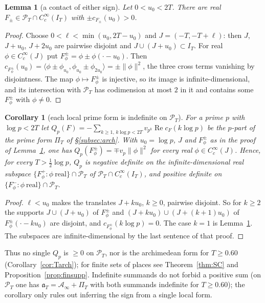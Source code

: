 \documentclass[11pt]{amsart}
\newtheorem{lemma}[theorem]{Lemma}
\newtheorem{corollary}[theorem]{Corollary}
\theoremstyle{definition}
\theoremstyle{remark}
\newcommand{\Rel}{\operatorname{Re}}
\newcommand{\PT}{\mathcal P_T}
\newcommand{\IT}{I_T}
\newcommand{\cF}{c_F}
\newcommand{\Ainf}{\mathcal A_\infty}
\newcommand{\PiT}{\Pi_T}
\begin{document}
\begin{lemma}[a contact of either sign]\label{lem:cpos}
Let $0<u_0<2T$. There are real $F_\pm\in\PT\cap C_c^\infty(\IT)$ with $\pm c_{F_\pm}(u_0)>0$.
\end{lemma}
\begin{proof}
Choose $0<\ell<\min(u_0,2T-u_0)$ and $J=(-T,-T+\ell)$: then $J$, $J+u_0$, $J+2u_0$ are pairwise disjoint
and $J\cup(J+u_0)\subset\IT$. For real $\phi\in C_c^\infty(J)$ put $F^\pm_\phi=\phi\pm\phi(\cdot-u_0)$. Then
$c_{F^\pm_\phi}(u_0)=\langle\phi\pm\phi_{u_0},\phi_{u_0}\pm\phi_{2u_0}\rangle=\pm\|\phi\|^2$, the three cross terms
vanishing by disjointness. The map $\phi\mapsto F^\pm_\phi$ is injective, so its image is
infinite-dimensional, and its intersection with $\PT$ has codimension at most $2$ in it and contains some
$F^\pm_\phi$ with $\phi\ne0$.
\end{proof}

\begin{corollary}[each local prime form is indefinite on $\PT$]\label{cor:Qp}
For a prime $p$ with $\log p<2T$ let $Q_p(F)=-\sum_{k\ge1,\,k\log p<2T}v_{p^k}\Rel\cF(k\log p)$ be the
$p$-part of the prime form $\PiT$ of \S\ref{subsec:arch}. With $u_0=\log p$, $J$ and $F^\pm_\phi$ as in
the proof of Lemma~\ref{lem:cpos}, one has $Q_p(F^\pm_\phi)=\mp v_p\|\phi\|^2$ for every real
$\phi\in C_c^\infty(J)$. Hence, for every $T>\frac12\log p$, $Q_p$ is negative definite on the
infinite-dimensional real subspace $\{F^+_\phi:\phi\ \text{real}\}\cap\PT$ of $\PT\cap C_c^\infty(\IT)$,
and positive definite on $\{F^-_\phi:\phi\ \text{real}\}\cap\PT$.
\end{corollary}
\begin{proof}
$\ell<u_0$ makes the translates $J+ku_0$, $k\ge0$, pairwise disjoint. So for $k\ge2$ the supports
$J\cup(J+u_0)$ of $F^\pm_\phi$ and $(J+ku_0)\cup(J+(k+1)u_0)$ of $F^\pm_\phi(\cdot-ku_0)$ are disjoint,
and $c_{F^\pm_\phi}(k\log p)=0$. The case $k=1$ is Lemma~\ref{lem:cpos}. The subspaces are
infinite-dimensional by the last sentence of that proof.
\end{proof}


Thus no single $Q_p$ is $\ge0$ on $\PT$, nor is the archimedean form for $T\ge0.60$
(Corollary~\ref{cor:Tarch}); for finite sets of places see Theorem~\ref{thm:SC} and
Proposition~\ref{prop:finsupp}. Indefinite summands do not forbid a positive sum (on $\PT$ one has
$\mathfrak a_T=\Ainf+\PiT$ with both summands indefinite for $T\ge0.60$); the corollary only rules out
inferring the sign from a single local form.
\end{document}
